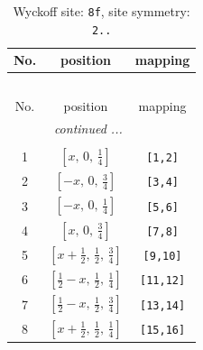 \documentclass[fleqn,8pt]{jsarticle}
\begin{document}
\begin{longtable}{ccc}
\caption{Wyckoff site: {\tt 8f}, site symmetry: {\tt 2..}}
 \\
 \hline \hline
No. & position & mapping \\ \hline \endfirsthead

\multicolumn{2}{l}{\tablename\ \thetable{}} \\
 \hline \hline
No. & position & mapping \\ \hline \endhead

 \hline \hline
\multicolumn{2}{r}{\footnotesize\it continued ...} \\ \endfoot

 \hline \hline
\multicolumn{2}{r}{} \\ \endlastfoot

1 & $\left[ x,\, 0,\, \frac{1}{4} \right]$ & {\tt [1,2]} \\ \hline
2 & $\left[ - x,\, 0,\, \frac{3}{4} \right]$ & {\tt [3,4]} \\ \hline
3 & $\left[ - x,\, 0,\, \frac{1}{4} \right]$ & {\tt [5,6]} \\ \hline
4 & $\left[ x,\, 0,\, \frac{3}{4} \right]$ & {\tt [7,8]} \\ \hline
5 & $\left[ x + \frac{1}{2},\, \frac{1}{2},\, \frac{3}{4} \right]$ & {\tt [9,10]} \\ \hline
6 & $\left[ \frac{1}{2} - x,\, \frac{1}{2},\, \frac{1}{4} \right]$ & {\tt [11,12]} \\ \hline
7 & $\left[ \frac{1}{2} - x,\, \frac{1}{2},\, \frac{3}{4} \right]$ & {\tt [13,14]} \\ \hline
8 & $\left[ x + \frac{1}{2},\, \frac{1}{2},\, \frac{1}{4} \right]$ & {\tt [15,16]} \\
\end{longtable}
\renewcommand{\arraystretch}{1.2}
\end{document}
